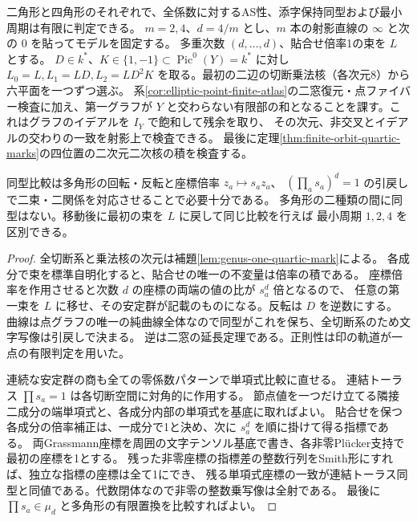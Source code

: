 \begin{corollary}\label{cor:quartic-cycle-atlas}
二角形と四角形のそれぞれで、全係数に対するAS性、添字保持同型および最小周期は有限に判定できる。
$m=2,4$、$d=4/m$ とし、$m$ 本の射影直線の $\infty$ と次の $0$ を貼ってモデルを固定する。
多重次数 $(d,\ldots,d)$、貼合せ倍率1の束を $L$ とする。
$D\in k^*$、$K\in\{1,-1\}\subset\operatorname{Pic}^0(Y)=k^*$ に対し
$L_0=L,L_1=LD,L_2=LD^2K$ を取る。最初の二辺の切断乗法核（各次元8）から六平面を一つずつ選ぶ。
系\ref{cor:elliptic-point-finite-atlas}の二窓復元・点ファイバー検査に加え、第一グラフが
$Y$ と交わらない有限部の和となることを課す。これはグラフのイデアルを $I_Y$ で飽和して残余を取り、
その次元、非交叉とイデアルの交わりの一致を射影上で検査できる。
最後に定理\ref{thm:finite-orbit-quartic-marks}の四位置の二次元二次核の積を検査する。

同型比較は多角形の回転・反転と座標倍率 $z_a\mapsto s_a z_a$、
$(\prod_a s_a)^d=1$ の引戻しで二束・二関係を対応させることで必要十分である。
多角形の二種類の間に同型はない。移動後に最初の束を $L$ に戻して同じ比較を行えば
最小周期 $1,2,4$ を区別できる。
\end{corollary}
\begin{proof}
全切断系と乗法核の次元は補題\ref{lem:genus-one-quartic-mark}による。
各成分で束を標準自明化すると、貼合せの唯一の不変量は倍率の積である。
座標倍率を作用させると次数 $d$ の座標の両端の値の比が $s_a^d$ 倍となるので、
任意の第一束を $L$ に移せ、その安定群が記載のものになる。反転は $D$ を逆数にする。
曲線は点グラフの唯一の純曲線全体なので同型がこれを保ち、全切断系のため文字写像は引戻しで決まる。
逆は二窓の延長定理である。正則性は印の軌道が一点の有限判定を用いた。

連続な安定群の商も全ての零係数パターンで単項式比較に直せる。
連結トーラス $\prod s_a=1$ は各切断空間に対角的に作用する。
節点値を一つだけ立てる隣接二成分の端単項式と、各成分内部の単項式を基底に取ればよい。
貼合せを保つ各成分の倍率補正は、一成分で1と決め、次に $s_a^d$ を順に掛けて得る指標である。
両Grassmann座標を周囲の文字テンソル基底で書き、各非零Plücker支持で最初の座標を1とする。
残った非零座標の指標差の整数行列をSmith形にすれば、独立な指標の座標は全て1にでき、
残る単項式座標の一致が連結トーラス同型と同値である。代数閉体なので非零の整数乗写像は全射である。
最後に $\prod s_a\in\mu_d$ と多角形の有限置換を比較すればよい。
\end{proof}
